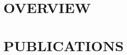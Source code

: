 \documentclass[final, notable, nolof, nolot, 11pt, nocover]{fithesis3}
\begin{document}
\pdfstringdefDisableCommands{%
	\let\MakeUppercase\relax
}

\listoftodos

\part{OVERVIEW}
\label{Sec:Overview}








\part{PUBLICATIONS}
\renewcommand{\thesection}{\arabic{section}}


\printbibliography[title=References]
\end{document}
